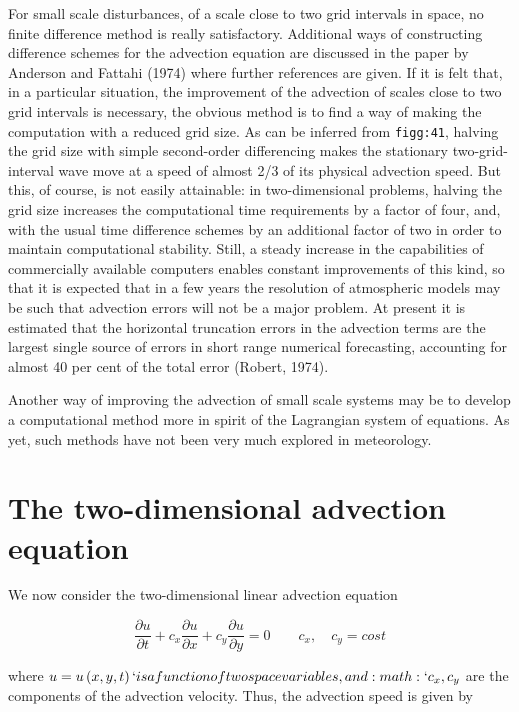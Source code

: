 For small scale disturbances, of a scale close to two grid intervals in
space, no finite difference method is really satisfactory. Additional
ways of constructing difference schemes for the advection equation are
discussed in the paper by Anderson and Fattahi (1974) where further
references are given. If it is felt that, in a particular situation, the
improvement of the advection of scales close to two grid intervals is
necessary, the obvious method is to find a way of making the computation
with a reduced grid size. As can be inferred from \texttt{figg:41},
halving the grid size with simple second-order differencing makes the
stationary two-grid-interval wave move at a speed of almost 2/3 of its
physical advection speed. But this, of course, is not easily attainable:
in two-dimensional problems, halving the grid size increases the
computational time requirements by a factor of four, and, with the usual
time difference schemes by an additional factor of two in order to
maintain computational stability. Still, a steady increase in the
capabilities of commercially available computers enables constant
improvements of this kind, so that it is expected that in a few years
the resolution of atmospheric models may be such that advection errors
will not be a major problem. At present it is estimated that the
horizontal truncation errors in the advection terms are the largest
single source of errors in short range numerical forecasting, accounting
for almost 40 per cent of the total error (Robert, 1974).

Another way of improving the advection of small scale systems may be to
develop a computational method more in spirit of the Lagrangian system
of equations. As yet, such methods have not been very much explored in
meteorology.

\section{The two-dimensional advection equation}\label{sec:the-two-dimensional-advection-equation}

We now consider the two-dimensional linear advection equation

\[\frac{\partial u}{\partial t} + c_{x}\frac{\partial u}{\partial x}+ c_y\frac{\partial u}{\partial y} = 0
\qquad c_x,\quad c_y = cost\]

where \(u = u\left( x,y,t \right)`is a function of two space
variables, and :math:`c_{x},c_{y}\) are the components of the advection
velocity. Thus, the advection speed is given by

